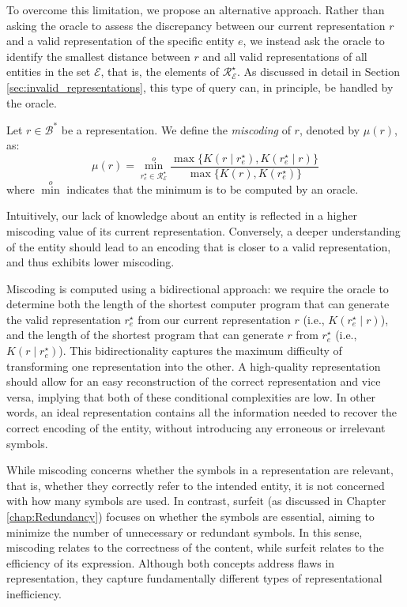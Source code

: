 To overcome this limitation, we propose an alternative approach. Rather than asking the oracle to assess the discrepancy between our current representation $r$ and a valid representation of the specific entity $e$, we instead ask the oracle to identify the smallest distance between $r$ and all valid representations of all entities in the set $\mathcal{E}$, that is, the elements of $\mathcal{R}^\star_\mathcal{E}$. As discussed in detail in Section \ref{sec:invalid_representations}, this type of query can, in principle, be handled by the oracle.

\begin{definition} [Miscoding]
\label{def:miscoding}
Let $r \in \mathcal{B}^\ast$ be a representation. We define the \emph{miscoding} of $r$, denoted by $\mu(r)$, as:
\[
\mu(r) = \overset{o}{ \underset{ r^\star_e \in \mathcal{R}^\star_\mathcal{E} } \min} \frac{ \max\{ K \left( r \mid r^\star_e \right), K \left( r^\star_e \mid r \right) \} } { \max\{ K \left( r \right), K \left( r^\star_e \right) \} }
\]
where $\overset{o}{\min}$ indicates that the minimum is to be computed by an oracle.
\end{definition}

Intuitively, our lack of knowledge about an entity is reflected in a higher miscoding value of its current representation. Conversely, a deeper understanding of the entity should lead to an encoding that is closer to a valid representation, and thus exhibits lower miscoding.

Miscoding is computed using a bidirectional approach: we require the oracle to determine both the length of the shortest computer program that can generate the valid representation $r^\star_e$ from our current representation $r$ (i.e., $K \left( r^\star_e \mid r \right)$), and the length of the shortest program that can generate $r$ from $r^\star_e$ (i.e., $K \left( r \mid r^\star_e \right)$). This bidirectionality captures the maximum difficulty of transforming one representation into the other. A high-quality representation should allow for an easy reconstruction of the correct representation and vice versa, implying that both of these conditional complexities are low. In other words, an ideal representation contains all the information needed to recover the correct encoding of the entity, without introducing any erroneous or irrelevant symbols.

While miscoding concerns whether the symbols in a representation are relevant, that is, whether they correctly refer to the intended entity, it is not concerned with how many symbols are used. In contrast, surfeit (as discussed in Chapter \ref{chap:Redundancy}) focuses on whether the symbols are essential, aiming to minimize the number of unnecessary or redundant symbols. In this sense, miscoding relates to the correctness of the content, while surfeit relates to the efficiency of its expression. Although both concepts address flaws in representation, they capture fundamentally different types of representational inefficiency.

